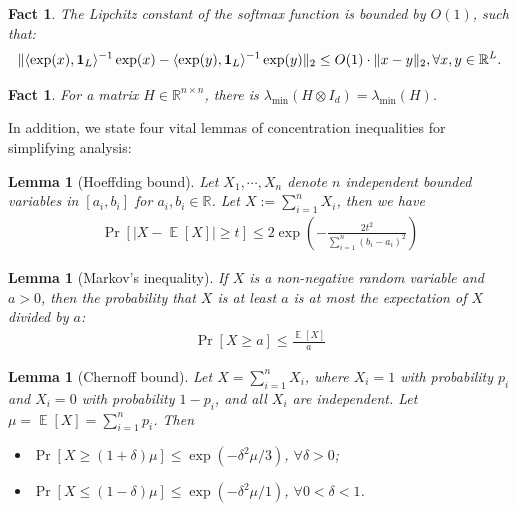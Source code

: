 \documentclass[11pt]{article}
\theoremstyle{plain}
\newtheorem{lemma}[theorem]{Lemma}
\newtheorem{fact}[theorem]{Fact}
\newcommand{\R}{\mathbb{R}}
\DeclareMathOperator*{\E}{{\mathbb{E}}}
\begin{document}
\begin{fact}\label{fac:lipschitz_softmax}
    The Lipchitz constant of the softmax function is bounded by $O(1)$, such that:
    \begin{align*}
        \| \langle \exp(x), {\bf 1}_L \rangle^{-1} \exp(x) - \langle \exp(y), {\bf 1}_L \rangle^{-1}\exp(y) \|_2 \leq O(1) \cdot \| x - y\|_2, \forall x, y \in \R^L.
    \end{align*}
\end{fact}

\begin{fact}\label{fac:lambda_min_krnocker}
    For a matrix $H \in \R^{n \times n}$, there is $\lambda_{\min}(H \otimes I_d) = \lambda_{\min}(H)$.
\end{fact}

In addition, we state four vital lemmas of concentration inequalities for simplifying analysis:

\begin{lemma}[Hoeffding bound]
\label{lem:hoeffding}
    Let $X_1, \cdots , X_n$ denote $n$ independent bounded variables in $[a_i, b_i]$ for $a_i, b_i \in \R$. Let $X := \sum_{i=1}^n X_i$, then we have
    \begin{align*}
        \Pr[|X - \E[X]| \geq t] \leq 2\exp(- \frac{2t^2}{\sum_{i=1}^n (b_i -a_i)^2} )
    \end{align*}
\end{lemma}

\begin{lemma}[Markov’s inequality]\label{lem:markov}
    If $X$ is a non-negative random variable and $a > 0$, then the probability that $X$ is at least $a$ is at most the expectation of $X$ divided by $a$:
    \begin{align*}
        \Pr[X \ge a] \leq \frac{\E[X]}{a}
    \end{align*}
\end{lemma}



\begin{lemma}[Chernoff bound]\label{lem:chernoff}
    Let $X = \sum_{i=1}^n X_i$, where $X_i = 1$ with probability $p_i$ and $X_i = 0$ with probability $1 - p_i$, and all $X_i$ are independent. Let $\mu = \E[X] = \sum_{i=1}^n p_i$. Then
    \begin{itemize}
        \item $\Pr[X \geq (1 + \delta)\mu] \leq \exp(-\delta^2\mu/3)$, $\forall \delta >0$;
        \item $\Pr[X \leq (1 - \delta)\mu] \leq \exp(-\delta^2\mu/1)$, $\forall 0 < \delta < 1$.
    \end{itemize}
\end{lemma}
\end{document}
